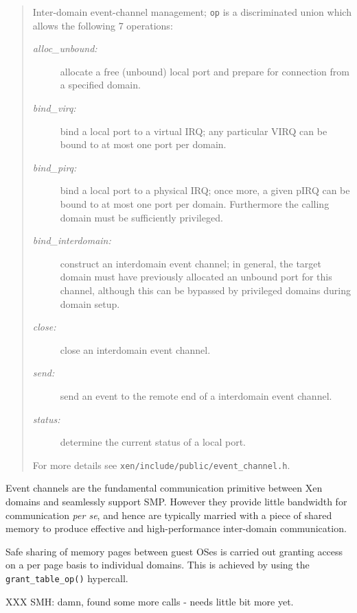 \documentclass[11pt,twoside,final,openright]{xenstyle}
\begin{document}
\begin{quote}

Inter-domain event-channel management; {\tt op} is a discriminated 
union which allows the following 7 operations: 

\begin{description} 

\item[\it alloc\_unbound:] allocate a free (unbound) local
  port and prepare for connection from a specified domain. 
\item[\it bind\_virq:] bind a local port to a virtual 
IRQ; any particular VIRQ can be bound to at most one port per domain. 
\item[\it bind\_pirq:] bind a local port to a physical IRQ;
once more, a given pIRQ can be bound to at most one port per
domain. Furthermore the calling domain must be sufficiently
privileged.
\item[\it bind\_interdomain:] construct an interdomain event 
channel; in general, the target domain must have previously allocated 
an unbound port for this channel, although this can be bypassed by 
privileged domains during domain setup. 
\item[\it close:] close an interdomain event channel. 
\item[\it send:] send an event to the remote end of a 
interdomain event channel. 
\item[\it status:] determine the current status of a local port. 
\end{description} 

For more details see
{\tt xen/include/public/event\_channel.h}. 

\end{quote} 

Event channels are the fundamental communication primitive between 
Xen domains and seamlessly support SMP. However they provide little
bandwidth for communication {\sl per se}, and hence are typically 
married with a piece of shared memory to produce effective and 
high-performance inter-domain communication. 

Safe sharing of memory pages between guest OSes is carried out granting
access on a per page basis to individual domains. This is achieved 
by using the {\tt grant\_table\_op()} hypercall. 

XXX SMH: damn, found some more calls - needs little bit more yet.

\end{document}
